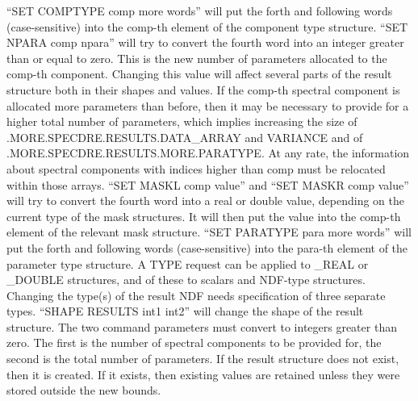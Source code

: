 {{{         ``SET COMPTYPE comp more words'' will put the forth and
            following words (case-sensitive) into the comp-th element
            of the component type structure.
         \sstitem
         ``SET NPARA comp npara'' will try to convert the fourth word
            into an integer greater than or equal to zero. This is the
            new number of parameters allocated to the comp-th component.
            Changing this value will affect several parts of the result
            structure both in their shapes and values. If the comp-th
            spectral component is allocated more parameters than before,
            then it may be necessary to provide for a higher total
            number of parameters, which implies increasing the size of
            .MORE.SPECDRE.RESULTS.DATA\_ARRAY and VARIANCE and of
            .MORE.SPECDRE.RESULTS.MORE.PARATYPE. At any rate, the
            information about spectral components with indices higher
            than comp must be relocated within those arrays.
         \sstitem
         ``SET MASKL comp value'' and ``SET MASKR comp value'' will try
            to convert the fourth word into a real or double value,
            depending on the current type of the mask structures. It
            will then put the value into the comp-th element of the
            relevant mask structure.
         \sstitem
         ``SET PARATYPE para more words'' will put the forth and
            following words (case-sensitive) into the para-th element
            of the parameter type structure.
      }
      A TYPE request can be applied to \_REAL or \_DOUBLE structures,
      and of these to scalars and NDF-type structures. Changing the
      type(s) of the result NDF needs specification of three separate
      types.
      ``SHAPE RESULTS int1 int2'' will change the shape of the result
      structure. The two command parameters must convert to integers
      greater than zero. The first is the number of spectral
      components to be provided for, the second is the total number
      of parameters. If the result structure does not exist, then it
      is created. If it exists, then existing values are retained
      unless they were stored outside the new bounds.
   }
}

